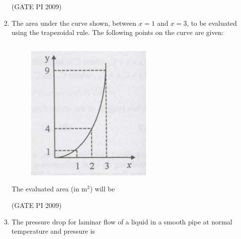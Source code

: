 \documentclass[journal,12pt,onecolumn]{IEEEtran}
\theoremstyle{remark}
\begin{document}
\begin{enumerate}
\begin{enumerate}
\end{enumerate}
\hfill (GATE PI 2009)
\item The area under the curve shown, between $x=1$ and $x=3$, to be evaluated using the trapezoidal rule. The following points on the curve are given:

$$$$
\newpage
\begin{figure}[h]
    \centering
    \includegraphics[width=0.3\linewidth]{figs/3.png}
    \label{fig:placeholder}
\end{figure} 
\begin{center}

\end{center}
The evaluated area (in m$^2$) will be
\begin{enumerate}
\end{enumerate}
\hfill (GATE PI 2009)
\item The pressure drop for laminar flow of a liquid in a smooth pipe at normal temperature and pressure is
\begin{enumerate}
\end{enumerate}
\end{enumerate}
\end{document}
